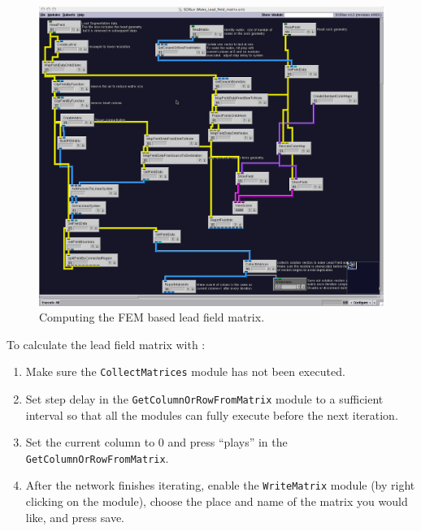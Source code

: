 \begin{figure}[H]
\begin{center}
\includegraphics[width=\textwidth]{ECGToolkitGuide_figures/leadfield_pot_fem.png}
\caption{Computing the FEM based lead field matrix.}
\label{fig:mat_pot_fem}
\end{center}
\end{figure}

To calculate the lead field matrix with
\newline {}:
\begin{enumerate}
\item{Make sure the {\tt CollectMatrices} module has not been executed.}
\item{Set step delay in the {\tt GetColumnOrRowFromMatrix} module to a sufficient interval so
that all the modules can fully execute before the next iteration.}
\item{Set the current column to 0 and press ``plays'' in the {\tt GetColumnOrRowFromMatrix}.}
\item{After the network finishes iterating, enable the {\tt WriteMatrix} module (by right clicking on
the module), choose the place and name of the matrix you would like, and press save.  }
\end{enumerate}

